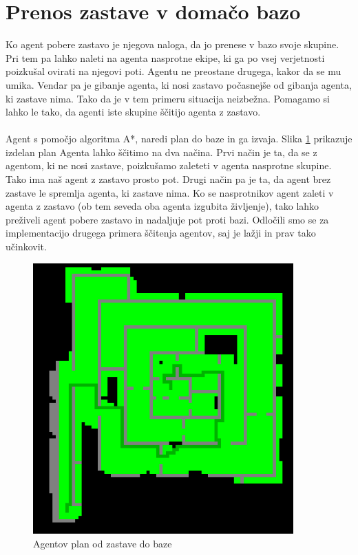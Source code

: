 \documentclass[12pt,a4paper,openany]{book}
\begin{document}
\section{Prenos zastave v domačo bazo}

Ko agent pobere zastavo je njegova naloga, da jo prenese v bazo svoje skupine. Pri tem pa lahko
 naleti na agenta nasprotne ekipe, ki ga po vsej verjetnosti poizkušal ovirati na njegovi poti.
 Agentu ne preostane drugega, kakor da se mu umika. Vendar pa je gibanje agenta, ki nosi zastavo
 počasnejše od gibanja agenta, ki zastave nima. Tako da je v tem primeru situacija neizbežna. 
Pomagamo si lahko le tako, da agenti iste skupine ščitijo agenta z zastavo.\\
\\
Agent s pomočjo algoritma A*, naredi plan do baze in ga izvaja. Slika \ref{plan} prikazuje izdelan 
plan Agenta lahko ščitimo na dva načina. Prvi način je ta, da se z agentom, ki ne nosi zastave, 
poizkušamo zaleteti v  agenta nasprotne skupine. Tako ima naš agent z zastavo prosto pot. 
Drugi način pa je ta, da agent brez zastave le spremlja agenta, ki zastave nima. Ko se 
nasprotnikov agent zaleti v agenta z zastavo (ob tem seveda oba agenta izgubita življenje), 
tako lahko preživeli agent pobere zastavo in nadaljuje pot proti bazi. Odločili smo se za 
implementacijo drugega primera ščitenja agentov, saj je lažji in prav tako učinkovit.\\
\begin{figure}[ht]
 \centering
 \includegraphics[width=10cm]{./pictures/plan.png}
 \caption[Izdelan plan]{Agentov plan od zastave do baze}
 \label{plan}
\end{figure}
\end{document}
